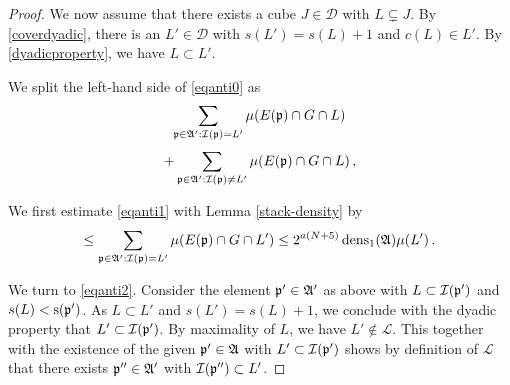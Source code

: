 {\begin{proof}
We now assume that there exists a cube $J \in \mathcal{D}$ with $L \subsetneq J$.
By \eqref{coverdyadic}, there is an
$L'\in \mathcal{D}$ with $s(L')=s(L)+1$ and $c(L)\in L'$. By \eqref{dyadicproperty}, we have
$L\subset L'$.

We split the left-hand side of \eqref{eqanti0} as
\begin{equation}\label{eqanti1}
    \sum_{{\mathfrak p}\in\mathfrak{A}':{\mathcal{I}}({\mathfrak p})=L'}\mu(E({\mathfrak p})\cap G\cap L)
\end{equation}
\begin{equation}\label{eqanti2}
    +
     \sum_{{\mathfrak p}\in\mathfrak{A}':{\mathcal{I}}({\mathfrak p})\neq L'}\mu(E({\mathfrak p})\cap G\cap L)\, ,
\end{equation}

We first estimate \eqref{eqanti1}
with Lemma \ref{stack-density} by
\begin{equation}\label{equanti1.5}
    \le \sum_{{\mathfrak p}\in\mathfrak{A}':{\mathcal{I}}({\mathfrak p})=L'}\mu(E({\mathfrak p})\cap G\cap L')\le 2^{a(N+5)}\operatorname{\operatorname{dens}}_1(\mathfrak{A})\mu(L')\, .
\end{equation}



We turn to \eqref{eqanti2}.
Consider the element ${\mathfrak p}'\in \mathfrak{A}'$ as above
with $L\subset {\mathcal{I}}({\mathfrak p}')$ and $s(L)<{\mathrm{s}}({\mathfrak p}')$.
As $L\subset L'$ and $s(L')=s(L)+1$, we conclude with the dyadic property that $L'\subset {\mathcal{I}}({\mathfrak p}')$.
By maximality of $L$, we have
$L'\not\in \mathcal{L}$.
This together with the existence of the given ${\mathfrak p}'\in \mathfrak{A}$
with $L'\subset {\mathcal{I}}({\mathfrak p}')$
shows by definition of $\mathcal{L}$ that there exists ${\mathfrak p}''\in \mathfrak{A}'$ with
${\mathcal{I}}({\mathfrak p}'')\subset L'$.





\end{proof}}

